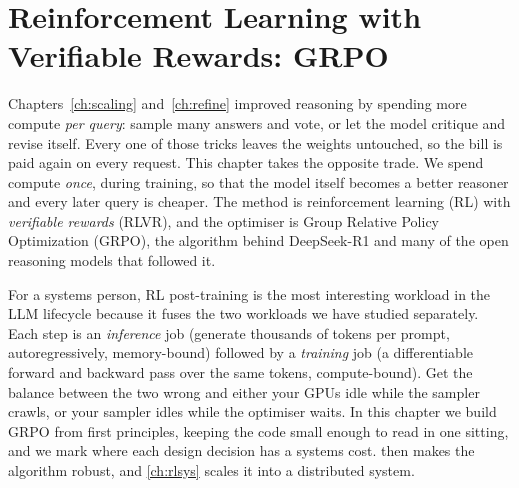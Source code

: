 \chapter{Reinforcement Learning with Verifiable Rewards: GRPO}\label{ch:grpo}

Chapters~\ref{ch:scaling} and~\ref{ch:refine} improved reasoning by spending more
compute \emph{per query}: sample many answers and vote, or let the model critique and
revise itself. Every one of those tricks leaves the weights untouched, so the bill is paid
again on every request. This chapter takes the opposite trade. We spend compute
\emph{once}, during training, so that the model itself becomes a better reasoner and every
later query is cheaper. The method is reinforcement learning (RL) with \emph{verifiable
rewards} (RLVR), and the optimiser is Group Relative Policy Optimization (GRPO), the
algorithm behind DeepSeek-R1 and many of the open reasoning models that followed it.

For a systems person, RL post-training is the most interesting workload in the LLM
lifecycle because it fuses the two workloads we have studied separately. Each step is an
\emph{inference} job (generate thousands of tokens per prompt, autoregressively,
memory-bound) followed by a \emph{training} job (a differentiable forward and backward
pass over the same tokens, compute-bound). Get the balance between the two wrong and
either your GPUs idle while the sampler crawls, or your sampler idles while the optimiser
waits. In this chapter we build GRPO from first principles, keeping the code small enough
to read in one sitting, and we mark where each design decision has a systems cost.
 then makes the algorithm robust, and \cref{ch:rlsys} scales it into a
distributed system.

